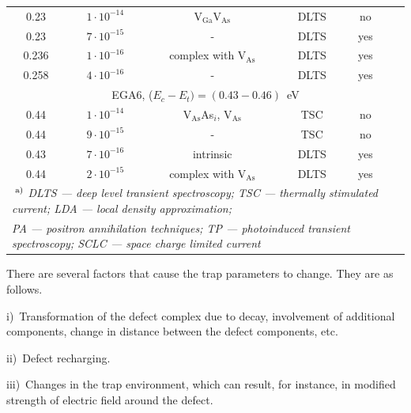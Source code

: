 \documentclass[final,3p,times,twocolumn,authoryear]{elsarticle}
\begin{document}
\begin{table}
\begin{tabular}{cccccc}
0.23&$1\cdot10^{-14}$&V$_\mathrm{Ga}$V$_\mathrm{As}$&DLTS&no&\cite{Bourgoin:GaAs}\\ %
0.23&$7\cdot10^{-15}$&-&DLTS&yes&\cite{Mircea1975}\\ %
0.236&$1\cdot10^{-16}$&complex with V$_\mathrm{As}$&DLTS&yes&\cite{GaAsBlood}\\ %
0.258&$4\cdot10^{-16}$&-&DLTS&yes&\cite{Yousefi1995}\\ %
\multicolumn{6}{c}{EGA6, ($E_c-E_t)=(0.43-0.46)$~eV}\\
0.44&$1\cdot10^{-14}$&V$_\mathrm{As}$As$_i$, V$_\mathrm{As}$&TSC&no&\cite{Pavlovic2000}\\ %
0.44&$9\cdot10^{-15}$&-&TSC&no&\cite{Pavlovic:GaAs}\\ %
\multirow{2}{*}{0.43}&\multirow{2}{*}{$7\cdot10^{-16}$}&\multirow{2}{*}{intrinsic}&\multirow{2}{*}{DLTS}&\multirow{2}{*}{yes}&\cite{Lefevre1977}\\
&&&&&\cite{Bourgoin:GaAs}\\
0.44&$2\cdot10^{-15}$&complex with V$_\mathrm{As}$&DLTS&yes&\cite{KolFTP1989En}\\ %
\multicolumn{6}{l}{$\textsuperscript{ a)}$ \emph{DLTS --- deep level transient spectroscopy;
TSC --- thermally stimulated current; LDA --- local density approximation;}}\\
\multicolumn{6}{l}{ \emph{PA --- positron annihilation techniques;
TP --- photoinduced transient spectroscopy;
SCLC --- space charge limited current}}\\
\hline
\end{tabular}
\end{table}

There are several factors that cause the trap parameters to change.
They are as follows.

\noindent
i)~Transformation of the defect complex due to decay, involvement of additional components, change in distance between the defect components, etc.

\noindent
ii)~Defect recharging.

\noindent
iii)~Changes in the trap environment, which can result, for instance, in modified strength of electric field around the defect.
\end{document}
